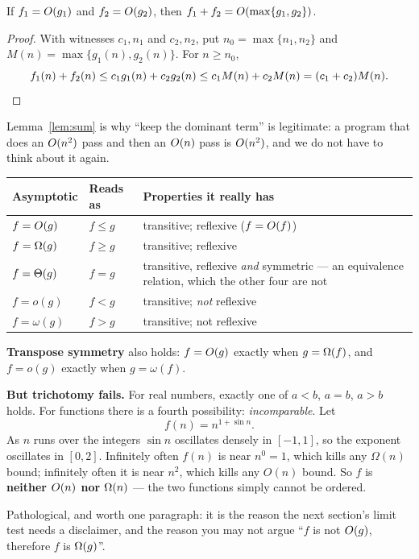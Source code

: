 \begin{lemma}\label{lem:sum}
If $f_{1} = O(g_{1})$ and $f_{2} = O(g_{2})$, then
$f_{1} + f_{2} = O(\max\{g_{1}, g_{2}\})$.
\end{lemma}

\begin{proof}
With witnesses $c_{1}, n_{1}$ and $c_{2}, n_{2}$, put $n_{0} = \max\{n_{1},
n_{2}\}$ and $M(n) = \max\{g_{1}(n), g_{2}(n)\}$. For $n \ge n_{0}$,
\[ f_{1}(n) + f_{2}(n) \le c_{1}g_{1}(n) + c_{2}g_{2}(n)
   \le c_{1}M(n) + c_{2}M(n) = (c_{1}+c_{2})M(n). \qedhere \]
\end{proof}

Lemma~\ref{lem:sum} is why ``keep the dominant term'' is legitimate: a program
that does an $O(n^{2})$ pass and then an $O(n)$ pass is $O(n^{2})$,
and we do not have to think about it again.

\begin{conceptbox}
\begin{longtable}{@{}L{2.4cm}L{1.8cm}L{10.1cm}@{}}
\toprule
{}
\textbf{Asymptotic} & \textbf{Reads as} & \textbf{Properties it really has} \\
\midrule
\endhead
$f = O(g)$   & $f \le g$ & transitive; reflexive ($f = O(f)$) \\
$f = \Omega(g)$  & $f \ge g$ & transitive; reflexive \\
$f = \Theta(g)$  & $f = g$   & transitive, reflexive \emph{and} symmetric ---
  an equivalence relation, which the other four are not \\
$f = o(g)$       & $f < g$   & transitive; \emph{not} reflexive \\
$f = \omega(g)$  & $f > g$   & transitive; not reflexive \\
\bottomrule
\end{longtable}

\smallskip
\textbf{Transpose symmetry} also holds: $f = O(g)$ exactly when
$g = \Omega(f)$, and $f = o(g)$ exactly when $g = \omega(f)$.

\smallskip
\textbf{But trichotomy fails.} For real numbers, exactly one of $a < b$,
$a = b$, $a > b$ holds. For functions there is a fourth possibility:
\emph{incomparable}. Let
\[ f(n) = n^{1 + \sin n}. \]
As $n$ runs over the integers $\sin n$ oscillates densely in $[-1, 1]$, so the
exponent oscillates in $[0, 2]$. Infinitely often $f(n)$ is near $n^{0} = 1$,
which kills any $\Omega(n)$ bound; infinitely often it is near $n^{2}$, which
kills any $O(n)$ bound. So $f$ is \textbf{neither $O(n)$ nor
$\Omega(n)$} --- the two functions simply cannot be ordered.

\smallskip
Pathological, and worth one paragraph: it is the reason the next section's limit
test needs a disclaimer, and the reason you may not argue ``$f$ is not
$O(g)$, therefore $f$ is $\Omega(g)$''.
\end{conceptbox}

